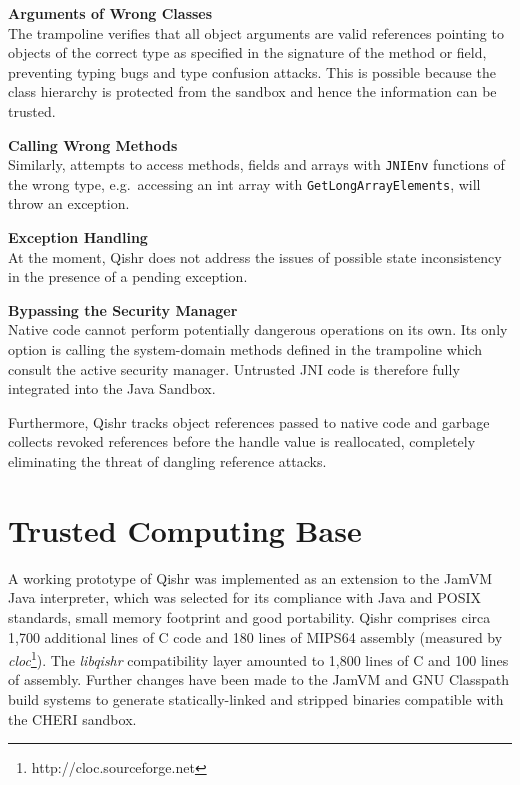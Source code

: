 \documentclass[a4paper,12pt,twoside,openright]{report}
\newcommand{\keyword}[1]{\textsf{#1}}
\newcommand{\tool}[1]{\emph{#1}}
\newcommand{\lib}[1]{\tool{lib#1}}
\begin{document}
\begin{description}
\item{\bf Arguments of Wrong Classes} \\
The trampoline verifies that all object arguments are valid references pointing to objects of the correct type as specified in the signature of the method or field, preventing typing bugs and type confusion attacks. This is possible because the class hierarchy is protected from the sandbox and hence the information can be trusted.

\item{\bf Calling Wrong Methods} \\
Similarly, attempts to access methods, fields and arrays with \texttt{JNIEnv} functions of the wrong type, e.g.\ accessing an \keyword{int} array with \texttt{Get\-Long\-Array\-Elements}, will throw an exception.

\item{\bf Exception Handling} \\
At the moment, Qishr does not address the issues of possible state inconsistency in the presence of a pending exception.

\item{\bf Bypassing the Security Manager} \\
Native code cannot perform potentially dangerous operations on its own. Its only option is calling the system-domain methods defined in the trampoline which consult the active security manager. Untrusted JNI code is therefore fully integrated into the Java Sandbox.
\end{description}

Furthermore, Qishr tracks object references passed to native code and garbage collects revoked references before the handle value is reallocated, completely eliminating the threat of dangling reference attacks.

\section{Trusted Computing Base}

A working prototype of Qishr was implemented as an extension to the JamVM Java interpreter, which was selected for its compliance with Java and POSIX standards, small memory footprint and good portability. Qishr comprises circa 1,700 additional lines of C code and 180 lines of MIPS64 assembly (measured by \emph{cloc}\footnote{http://cloc.sourceforge.net}). The \lib{qishr} compatibility layer amounted to 1,800 lines of C and 100 lines of assembly. Further changes have been made to the JamVM and GNU Classpath build systems to generate statically-linked and stripped binaries compatible with the CHERI sandbox.
\end{document}
